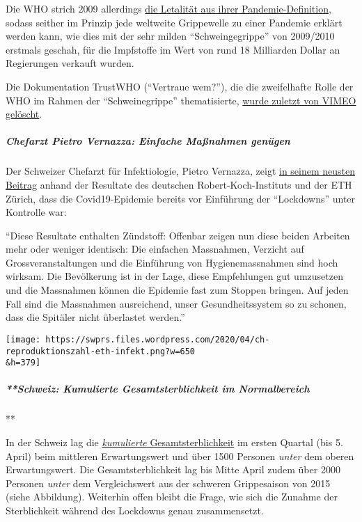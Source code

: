 Die WHO strich 2009 allerdings
\href{https://www.forbes.com/2010/02/05/world-health-organization-swine-flu-pandemic-opinions-contributors-michael-fumento.html\#5ae32fb848e8}{die
Letalität aus ihrer Pandemie-Definition}, sodass seither im Prinzip jede
weltweite Grippewelle zu einer Pandemie erklärt werden kann, wie dies
mit der sehr milden ``Schweingegrippe'' von 2009/2010 erstmals geschah,
für die Impfstoffe im Wert von rund 18 Milliarden Dollar an Regierungen
verkauft wurden.

Die Dokumentation TrustWHO (``Vertraue wem?''), die die zweifelhafte
Rolle der WHO im Rahmen der ``Schweinegrippe'' thematisierte,
\href{https://www.youtube.com/watch?v=VjQGyqVN5RM}{wurde zuletzt von
VIMEO gelöscht}.

\hypertarget{chefarzt-pietro-vernazza-einfache-mauxdfnahmen-genuxfcgen}{%
\subparagraph{\texorpdfstring{\textbf{Chefarzt Pietro Vernazza: Einfache
Maßnahmen
genügen}}{Chefarzt Pietro Vernazza: Einfache Maßnahmen genügen}}\label{chefarzt-pietro-vernazza-einfache-mauxdfnahmen-genuxfcgen}}

Der Schweizer Chefarzt für Infektiologie, Pietro Vernazza, zeigt
\href{https://infekt.ch/2020/04/sind-wir-tatsaechlich-im-blindflug/}{in
seinem neusten Beitrag} anhand der Resultate des deutschen
Robert-Koch-Instituts und der ETH Zürich, dass die Covid19-Epidemie
bereits vor Einführung der ``Lockdowns'' unter Kontrolle war:

``Diese Resultate enthalten Zündstoff: Offenbar zeigen nun diese beiden
Arbeiten mehr oder weniger identisch: Die einfachen Massnahmen, Verzicht
auf Grossveranstaltungen und die Einführung von Hygienemassnahmen sind
hoch wirksam. Die Bevölkerung ist in der Lage, diese Empfehlungen gut
umzusetzen und die Massnahmen können die Epidemie fast zum Stoppen
bringen. Auf jeden Fall sind die Massnahmen ausreichend, unser
Gesundheitssystem so zu schonen, dass die Spitäler nicht überlastet
werden.''

\texttt{[image: https://swprs.files.wordpress.com/2020/04/ch-reproduktionszahl-eth-infekt.png?w=650\\\&h=379]}

\hypertarget{schweiz-kumulierte-gesamtsterblichkeit-im-normalbereich}{%
\subparagraph{**Schweiz: Kumulierte Gesamtsterblichkeit im
Normalbereich}\label{schweiz-kumulierte-gesamtsterblichkeit-im-normalbereich}}

**

In der Schweiz lag die
\href{https://swprs.files.wordpress.com/2020/04/ch-sterblichkeit-kumuliert-q1-2020.pdf}{\emph{kumulierte}
Gesamtsterblichkeit} im ersten Quartal (bis 5. April) beim mittleren
Erwartungswert und über 1500 Personen \emph{unter} dem oberen
Erwartungswert. Die Gesamtsterblichkeit lag bis Mitte April zudem über
2000 Personen \emph{unter} dem Vergleichswert aus der schweren
Grippesaison von 2015 (siehe Abbildung). Weiterhin offen bleibt die
Frage, wie sich die Zunahme der Sterblichkeit während des Lockdowns
genau zusammensetzt.

